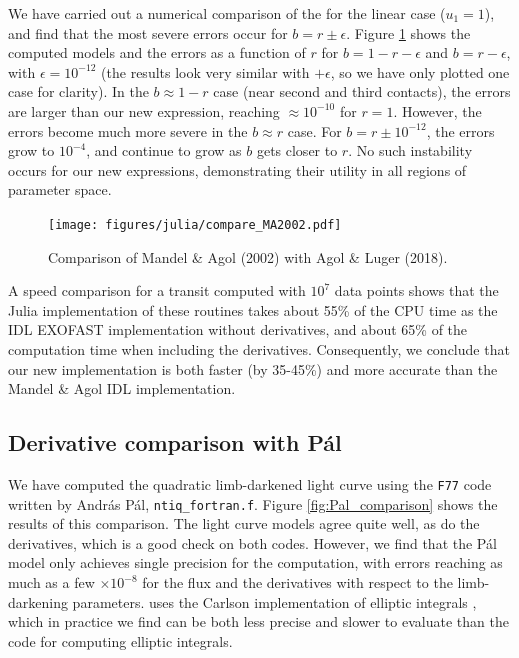 \documentclass[modern]{aastex61}
\begin{document}
We have carried out a numerical comparison of the \citet{MandelAgol2002}
for the linear case ($u_1=1$), and find that the most severe errors
occur for $b = r \pm \epsilon$.  Figure \ref{fig:compareMA} shows
the computed models and the errors as a function of $r$ for $b=1-r-\epsilon$
and $b=r-\epsilon$, with $\epsilon = 10^{-12}$ (the results look very
similar with $+\epsilon$, so we have only plotted one case for clarity).
In the $b\approx 1-r$ case (near second and third contacts), the errors
are larger than our new expression, reaching $\approx 10^{-10}$ for
$r = 1$.  However, the errors become much more severe in the $b \approx r$
case.  For $b=r \pm 10^{-12}$, the errors grow to $10^{-4}$, and continue
to grow as $b$ gets closer to $r$.  No such instability occurs for
our new expressions, demonstrating their utility in all regions of
parameter space.

\begin{figure}
    \begin{centering}
    \texttt{[image: figures/julia/compare\_MA2002.pdf]}
    \caption{Comparison of Mandel \& Agol (2002) with Agol \& Luger (2018).
    }
    \label{fig:compareMA}
    \end{centering}
\end{figure}

A speed comparison for a transit computed with $10^7$ data points shows that
the Julia implementation of these routines takes about 55\% of the CPU
time as the IDL EXOFAST implementation without derivatives, and about 65\%
of the computation time when including the derivatives.  Consequently, we
conclude that our new implementation is both faster (by 35-45\%) and more 
accurate than the Mandel \& Agol IDL implementation.

\subsection{Derivative comparison with P\'al}

We have computed the quadratic limb-darkened light curve using the \texttt{F77}
code written by Andr\'as P\'al, \texttt{ntiq\_fortran.f}.
Figure \ref{fig:Pal_comparison} shows the results of this comparison.
The light curve models agree quite well, as do the derivatives, which is
a good check on both codes.  However, we find that the P\'al model only
achieves single precision for the computation, with errors reaching as
much as a few $\times 10^{-8}$ for the flux and the derivatives with
respect to the limb-darkening parameters.  \citet{Pal2008} uses the
Carlson implementation of elliptic integrals \citep{Carlson1979},
which in practice we find can be both less precise and slower to
evaluate than the \citet{Bulirsch1965a} code for computing elliptic
integrals.
\end{document}
